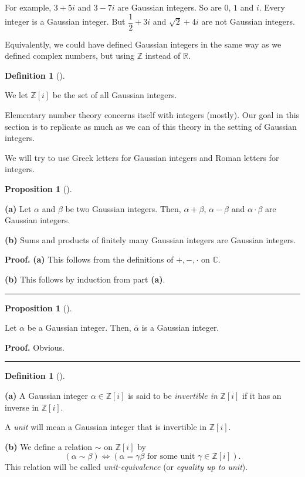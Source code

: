 \documentclass[numbers=enddot,12pt,final,onecolumn,notitlepage]{scrartcl}%
\numberwithin{exer}{subsection}
\theoremstyle{definition}
\newtheorem{prop}[theo]{Proposition}
\newenvironment{proposition}[1][]
{\begin{prop}[#1]\begin{leftbar}}
{\end{leftbar}\end{prop}}
\newtheorem{defi}[theo]{Definition}
\newenvironment{definition}[1][]
{\begin{defi}[#1]\begin{leftbar}}
{\end{leftbar}\end{defi}}
\newenvironment{proof}[1][Proof]{\noindent\textbf{#1.} }{\ \rule{0.5em}{0.5em}}
\begin{document}
For example, $3+5i$ and $3-7i$ are Gaussian integers. So are $0$, $1$ and $i$.
Every integer is a Gaussian integer. But $\dfrac{1}{2}+3i$ and $\sqrt{2}+4i$
are not Gaussian integers.

Equivalently, we could have defined Gaussian integers in the same way as we
defined complex numbers, but using $\mathbb{Z}$ instead of $\mathbb{R}$.

\begin{definition}
\label{def.Z[i].gauss.Z[i]}We let $\mathbb{Z}\left[  i\right]  $ be the set of
all Gaussian integers.
\end{definition}

Elementary number theory concerns itself with integers (mostly). Our goal in
this section is to replicate as much as we can of this theory in the setting
of Gaussian integers.

We will try to use Greek letters for Gaussian integers and Roman letters for integers.

\begin{proposition}
\label{prop.Z[i].gauss.ring}\textbf{(a)} Let $\alpha$ and $\beta$ be two
Gaussian integers. Then, $\alpha+\beta$, $\alpha-\beta$ and $\alpha\cdot\beta$
are Gaussian integers.

\textbf{(b)} Sums and products of finitely many Gaussian integers are Gaussian integers.
\end{proposition}

\begin{proof}
\textbf{(a)} This follows from the definitions of $+,-,\cdot$ on $\mathbb{C}$.

\textbf{(b)} This follows by induction from part \textbf{(a)}.
\end{proof}

\begin{proposition}
\label{prop.Z[i].gauss.conj}Let $\alpha$ be a Gaussian integer. Then,
$\overline{\alpha}$ is a Gaussian integer.
\end{proposition}

\begin{proof}
Obvious.
\end{proof}

\begin{definition}
\label{def.Z[i].gauss.unit}\textbf{(a)} A Gaussian integer $\alpha
\in\mathbb{Z}\left[  i\right]  $ is said to be \textit{invertible in}\textbf{
}$\mathbb{Z}\left[  i\right]  $ if it has an inverse in $\mathbb{Z}\left[
i\right]  $.

A \textit{unit} will mean a Gaussian integer that is invertible in
$\mathbb{Z}\left[  i\right]  $.

\textbf{(b)} We define a relation $\sim$ on $\mathbb{Z}\left[  i\right]  $ by%
\[
\left(  \alpha\sim\beta\right)  \Longleftrightarrow\left(  \alpha=\gamma
\beta\text{ for some unit }\gamma\in\mathbb{Z}\left[  i\right]  \right)  .
\]
This relation will be called \textit{unit-equivalence} (or \textit{equality up
to unit}).
\end{definition}
\end{document}
